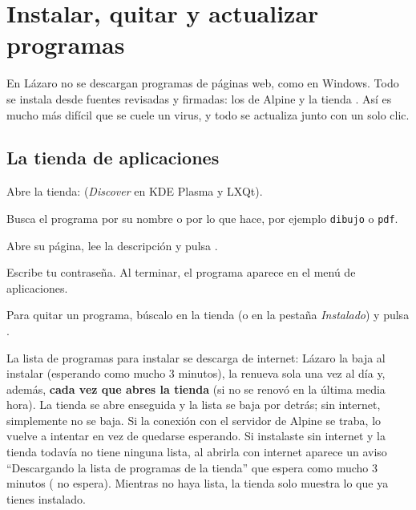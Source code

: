 \chapter{Instalar, quitar y actualizar programas}\label{cap:13-programas}

En Lázaro no se descargan programas de páginas web, como en Windows. Todo
se instala desde fuentes revisadas y firmadas: los  de
Alpine y la tienda . Así es mucho más difícil que se cuele
un virus, y todo se actualiza junto con un solo clic.

\section{La tienda de aplicaciones}\label{sec:tienda}

\begin{pasos}
  \item Abre la tienda: 
        (\emph{Discover} en KDE Plasma y LXQt).
  \item Busca el programa por su nombre o por lo que hace, por ejemplo
        \texttt{dibujo} o \texttt{pdf}.
  \item Abre su página, lee la descripción y pulsa .
  \item Escribe tu contraseña. Al terminar, el programa aparece en el menú
        de aplicaciones.
\end{pasos}


Para quitar un programa, búscalo en la tienda (o en la pestaña
\emph{Instalado}) y pulsa .

\begin{nota}
La lista de programas para instalar se descarga de internet: Lázaro la
baja al instalar (esperando como mucho 3 minutos), la renueva sola una
vez al día y, además, \textbf{cada vez que abres la tienda} (si no se
renovó en la última media hora). La tienda se abre enseguida y la lista
se baja por detrás; sin internet, simplemente no se baja. Si la conexión
con el servidor de Alpine se traba, lo vuelve a intentar en vez de
quedarse esperando. Si instalaste sin internet y la tienda todavía no
tiene ninguna lista, al abrirla con internet aparece un aviso
\enquote{Descargando la lista de programas de la tienda} que espera
como mucho 3 minutos ( no espera). Mientras no haya
lista, la tienda solo muestra lo que ya tienes instalado.
\end{nota}


